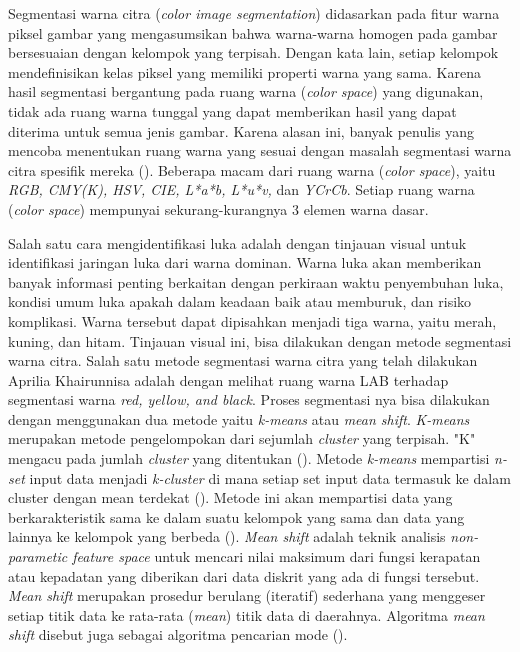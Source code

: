 Segmentasi warna citra (\textit{color image segmentation}) 
didasarkan pada fitur warna piksel gambar yang 
mengasumsikan bahwa warna-warna homogen pada gambar 
bersesuaian dengan kelompok yang terpisah. Dengan kata 
lain, setiap kelompok mendefinisikan kelas piksel yang 
memiliki properti warna yang sama. Karena hasil segmentasi 
bergantung pada ruang warna (\textit{color space}) yang 
digunakan, tidak ada ruang warna tunggal yang dapat 
memberikan hasil yang dapat diterima untuk semua jenis 
gambar. Karena alasan ini, banyak penulis yang mencoba 
menentukan ruang warna yang sesuai dengan masalah 
segmentasi warna citra spesifik mereka (\cite{khattab}). 
Beberapa macam dari ruang warna (\textit{color space}), 
yaitu \textit{RGB, CMY(K), HSV, CIE, L*a*b, L*u*v,} dan 
\textit{YCrCb}. Setiap ruang warna (\textit{color space}) 
mempunyai sekurang-kurangnya 3 elemen warna dasar.

Salah satu cara mengidentifikasi luka adalah dengan 
tinjauan visual untuk identifikasi jaringan luka dari 
warna dominan. Warna luka akan memberikan banyak informasi 
penting berkaitan dengan perkiraan waktu penyembuhan luka, 
kondisi umum luka apakah dalam keadaan baik atau memburuk, 
dan risiko komplikasi. Warna tersebut dapat dipisahkan 
menjadi tiga warna, yaitu merah, kuning, dan hitam. 
Tinjauan visual ini, bisa dilakukan dengan metode 
segmentasi warna citra. Salah satu metode segmentasi warna 
citra yang telah dilakukan Aprilia Khairunnisa adalah 
dengan melihat ruang warna LAB terhadap segmentasi warna 
\textit{red, yellow, and black}. Proses segmentasi nya bisa 
dilakukan dengan menggunakan dua metode yaitu 
\textit{k-means} atau \textit{mean shift}. 
\textit{K-means} merupakan metode pengelompokan dari 
sejumlah \textit{cluster} yang terpisah. "K" mengacu pada 
jumlah \textit{cluster} yang ditentukan (\cite{YadavSeg}). 
Metode \textit{k-means} mempartisi \textit{n-set} input 
data menjadi \textit{k-cluster} di mana setiap set input 
data termasuk ke dalam cluster dengan mean terdekat 
(\cite{ZhengX}). Metode ini akan mempartisi data yang 
berkarakteristik sama ke dalam suatu kelompok yang sama dan 
data yang lainnya ke kelompok yang berbeda 
(\cite{Gustientiedina}). \textit{Mean shift} adalah teknik 
analisis \textit{non-parametic feature space} untuk mencari 
nilai maksimum dari fungsi kerapatan atau kepadatan yang 
diberikan dari data diskrit yang ada di fungsi tersebut. 
\textit{Mean shift} merupakan prosedur berulang (iteratif) 
sederhana yang menggeser setiap titik data ke rata-rata 
(\textit{mean}) titik data di daerahnya. Algoritma 
\textit{mean shift} disebut juga sebagai algoritma 
pencarian mode (\cite{ChengY}). 

